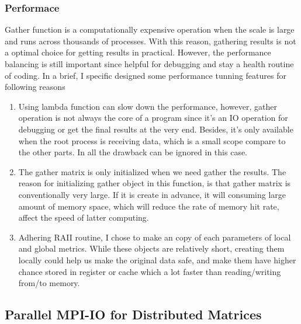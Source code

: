 \subsubsection{Performace} \label{SEC:GATHER_PERFORMANCE}
Gather function is a computationally expensive operation when the scale is large and runs across thousands of processes. 
With this reason, gathering results is not a optimal choice for getting results in practical.
However, the performance balancing is still important since helpful for debugging and stay a health routine of coding.
In a brief, I specific designed some performance tunning features for following reasons
\begin{enumerate}
  \item Using lambda function can slow down the performance, however, gather operation is not always the core of a 
  program since it's an IO operation for debugging or get the final results at the very end. 
  Besides, it's only available when the root process is receiving data, which is a small scope compare to the other parts.
  In all the drawback can be ignored in this case.
  \item The gather matrix is only initialized when we need gather the results.
  The reason for initializing gather object in this function, is that gather matrix is conventionally very large. 
  If it is create in advance, it will consuming large amount of memory space, which will reduce the rate of memory hit rate, 
  affect the speed of latter computing.
  \item Adhering RAII routine, I chose to make an copy of each parameters of local and global metrics. 
  While these objects are relatively short, creating them locally could help us make the original data safe, 
  and make them have higher chance stored in register or cache which a lot faster than reading/writing from/to memory.
\end{enumerate}

\subsection{Parallel MPI-IO for Distributed Matrices}

